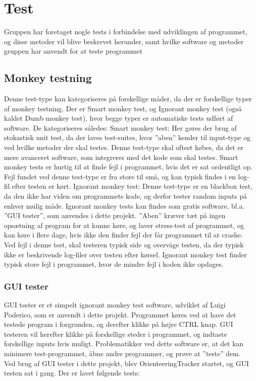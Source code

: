 \chapter{Test}
Gruppen har foretaget nogle tests i forbindelse med udviklingen af programmet, og disse metoder vil blive beskrevet herunder, samt hvilke software og metoder gruppen har anvendt for at teste programmet
\section{Monkey testning}
Denne test-type kan kategoriseres på forskellige måder, da der er forskellige typer af monkey testning. Der er Smart monkey test, og Ignorant monkey test (også kaldet Dumb monkey test), hvor begge typer er automatiske tests udført af software. De kategoriseres således:
Smart monkey test: Her gøres der brug af stokastisk unit test, da der laves test-suites, hvor ”aben” kender til input-type og ved hvilke metoder der skal testes. Denne test-type skal oftest købes, da det er mere avanceret software, som integreres med det kode som skal testes.
Smart monkey tests er hurtig til at finde fejl i programmet, hvis det er sat ordentligt op. Fejl fundet ved denne test-type er fra store til små, og kan typisk findes i en log-fil efter testen er kørt.
Ignorant monkey test: Denne test-type er en blackbox test, da den ikke har viden om programmets kode, og derfor tester random inputs på enhver mulig måde. Ignorant monkey tests kan findes som gratis software, bl.a. ”GUI tester”, som anvendes i dette projekt. ”Aben” kræver tæt på ingen opsætning af program for at kunne køre, og laver stress-test af programmet, og kan køre i flere dage, hvis ikke den finder fejl der får programmet til at crashe. Ved fejl i denne test, skal testeren typisk side og overvåge testen, da der typisk ikke er beskrivende log-filer over testen efter kørsel. Ignorant monkey test finder typisk store fejl i programmet, hvor de mindre fejl i koden ikke opdages. \citep{ExI}

\subsection{GUI tester}
GUI tester er et simpelt ignorant monkey test software, udviklet af Luigi Poderico, som er anvendt i dette projekt. Programmet køres ved at have det testede program i forgrunden, og derefter klikke på højre CTRL knap. GUI testeren vil herefter klikke på forskellige steder i programmet, og indtaste forskellige inputs hvis muligt. Problematikker ved dette software er, at det kan minimere test-programmet, åbne andre programmer, og prøve at ”teste” dem. \citep{GUItester} \newline
Ved brug af GUI tester i dette projekt, blev OrienteeringTracker startet, og GUI testen sat i gang. Der er lavet følgende tests:

